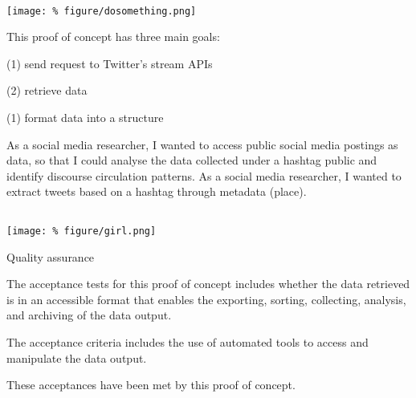 \documentclass[unknownkeysallowed,usepdftitle=false, parskip=full]{beamer}
\newcommand{\secvariable}{nothing}
\newcommand{\mysection}[1]{\renewcommand{\secvariable}{#1}
}
\begin{document}
\begin{frame}\label{slabtable}
\begin{columns}
\begin{column}[t]{1.1\textwidth}
\hyperlink{slab}{\beamerbutton{\dots }}\\

\texttt{[image: \%
figure/dosomething.png]}

This proof of concept has three main goals:
\item 
(1) send request to Twitter's stream APIs
\item 
(2) retrieve data
\item 
(1) format data into a structure 
\item 
As a social media researcher, I wanted to access public social media postings as data, so that I could analyse the data collected under a hashtag public and identify discourse circulation patterns. As a social media researcher, I wanted to extract tweets based on a hashtag through metadata (place).


\vspace{0.3cm}
\end{column}
\end{columns}
 

\end{frame}




\mysection{minor}
\begin{frame}\label{\secvariable} %
\begin{center}
\texttt{[image: \%
figure/girl.png]}
\end{center}
\vspace{-0.2cm}

Quality assurance
\item The acceptance tests for this proof of concept includes whether the data retrieved is in an accessible format that enables the exporting, sorting, collecting, analysis, and archiving of the data output. 
\item 
The acceptance criteria includes the use of automated tools to access and manipulate the data output.
\item 
These acceptances have been met by this proof of concept.


\end{frame}
\end{document}
